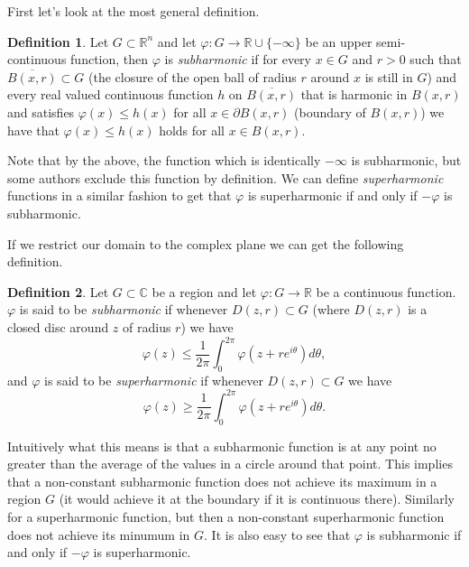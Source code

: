\documentclass[12pt]{article}
\theoremstyle{theorem}
\theoremstyle{definition}
\newtheorem*{defn}{Definition}
\theoremstyle{remark}
\begin{document}
First let's look at the most general definition.

\begin{defn}
Let $G \subset {\mathbb{R}}^n$ and let $\varphi \colon G \to
{\mathbb{R}} \cup \{ - \infty \}$ be an upper semi-continuous function,
then $\varphi$ is {\em subharmonic} if for every $x \in G$ and $r > 0$ such that
$\overline{B(x,r)} \subset G$ (the closure of the open ball of radius $r$ around $x$ is still in $G$) and every real valued continuous function $h$ on
$\overline{B(x,r)}$ that is harmonic in $B(x,r)$ and satisfies $\varphi(x) \leq h(x)$
for all $x \in \partial B(x,r)$ (boundary of $B(x,r)$) we have that
$\varphi(x) \leq h(x)$ holds for all $x \in B(x,r)$.
\end{defn}

Note that by the above, the function which is identically $- \infty$ is subharmonic, but some authors exclude this function by definition.
We can define {\em superharmonic} functions in a similar fashion to get that $\varphi$ is superharmonic if and only if $-\varphi$ is subharmonic.

If we restrict our domain to the complex plane we can get the following definition.

\begin{defn}
Let $G \subset {\mathbb{C}}$ be a region and let $\varphi \colon
G \to {\mathbb{R}}$ be a continuous function.  $\varphi$ is said to
be {\em subharmonic} if whenever $D(z,r) \subset G$ (where $D(z,r)$ is a closed
disc around $z$ of radius $r$) we have
\begin{equation*}
\varphi(z) \leq \frac{1}{2\pi} \int_0^{2\pi} \varphi(z+ r e^{i\theta}) d\theta ,
\end{equation*}
and $\varphi$ is said to be {\em superharmonic} if whenever $D(z,r) \subset G$
we have
\begin{equation*}
\varphi(z) \geq \frac{1}{2\pi} \int_0^{2\pi} \varphi(z+ r e^{i\theta}) d\theta .
\end{equation*}
\end{defn}

Intuitively what this means is that a subharmonic function is at any point
no greater than the average of the values in a circle around that point.  This implies that a non-constant subharmonic function does not achieve its maximum
in a region $G$ (it would achieve it at the boundary if it is continuous there).  Similarly for a superharmonic
function, but then a non-constant superharmonic function does not achieve its
minumum in $G$.  It is also easy to see that $\varphi$ is subharmonic if and only if $-\varphi$ is superharmonic.
\end{document}
